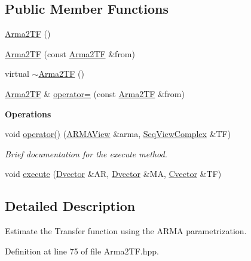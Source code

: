 \subsection*{Public Member Functions}
\begin{DoxyCompactItemize}
\item 
\hyperlink{classtsa_1_1_arma2_t_f_aabbe1c03f711805d11bf7f4951149617}{Arma2\+TF} ()
\item 
\hyperlink{classtsa_1_1_arma2_t_f_a93ac79691dd4f811d21f2021476ce4b5}{Arma2\+TF} (const \hyperlink{classtsa_1_1_arma2_t_f}{Arma2\+TF} \&from)
\item 
virtual \hyperlink{classtsa_1_1_arma2_t_f_aa48720a5c5a48ebfbaf1ee080f27a411}{$\sim$\+Arma2\+TF} ()
\item 
\hyperlink{classtsa_1_1_arma2_t_f}{Arma2\+TF} \& \hyperlink{classtsa_1_1_arma2_t_f_ac2fa5584ff0fed36eabfc908ded9b5de}{operator=} (const \hyperlink{classtsa_1_1_arma2_t_f}{Arma2\+TF} \&from)
\end{DoxyCompactItemize}
\begin{Indent}\textbf{ Operations}\par
\begin{DoxyCompactItemize}
\item 
void \hyperlink{classtsa_1_1_arma2_t_f_ab1e6a1c801109ef7f884317bacbe5f64}{operator()} (\hyperlink{classtsa_1_1_a_r_m_a_view}{A\+R\+M\+A\+View} \&arma, \hyperlink{namespacetsa_ab32775c889b53c40fa83939f22372b75}{Seq\+View\+Complex} \&TF)
\begin{DoxyCompactList}\small\item\em Brief documentation for the execute method. \end{DoxyCompactList}\item 
void \hyperlink{classtsa_1_1_arma2_t_f_ad7716bcd575670622bdec2fc32745e6e}{execute} (\hyperlink{namespacetsa_a8900fb03d849baf447a1a0efe2561fb2}{Dvector} \&AR, \hyperlink{namespacetsa_a8900fb03d849baf447a1a0efe2561fb2}{Dvector} \&MA, \hyperlink{namespacetsa_a054d1045ead95a65819e9e5722baf600}{Cvector} \&TF)
\end{DoxyCompactItemize}
\end{Indent}


\subsection{Detailed Description}
Estimate the Transfer function using the A\+R\+MA parametrization. 

Definition at line 75 of file Arma2\+T\+F.\+hpp.



